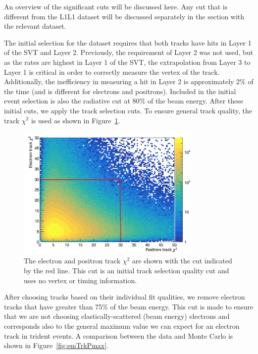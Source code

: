 \documentclass[twoside]{article}
\begin{document}
An overview of the significant cuts will be discussed here. Any cut that is different from the L1L1 dataset will be discussed separately in the section with the relevant dataset. 

\indent The initial selection for the dataset requires that both tracks have hits in Layer 1 of the SVT and Layer 2. Previously, the requirement of Layer 2 was not used, but as the rates are highest in Layer 1 of the SVT, the extrapolation from Layer 3 to Layer 1 is critical in order to correctly measure the vertex of the track. Additionally, the inefficiency in measuring a hit in Layer 2 is approximately 2$\%$ of the time (and is different for electrons and positrons). Included in the initial event selection is also the radiative cut at 80$\%$ of the beam energy. After these initial cuts, we apply the track selection cuts. To ensure general track quality, the track $\chi^2$ is used as shown in Figure~\ref{fig:trkChi2}.

\begin{figure}[H]
  \centering
      \includegraphics[width=0.8\textwidth]{plots/trkChi2.png}
  \caption{The electron and positron track $\chi^2$ are shown with the cut indicated by the red line. This cut is an initial track selection quality cut and uses no vertex or timing information.}
  \label{fig:trkChi2}
\end{figure} 

After choosing tracks based on their individual fit qualities, we remove electron tracks that have greater than 75$\%$ of the beam energy. This cut is made to ensure that we are not choosing elastically-scattered (beam energy) electrons and corresponds also to the general maximum value we can expect for an electron track in trident events. A comparison between the data and Monte Carlo is shown in Figure~\ref{fig:emTrkPmax}.
\end{document}
